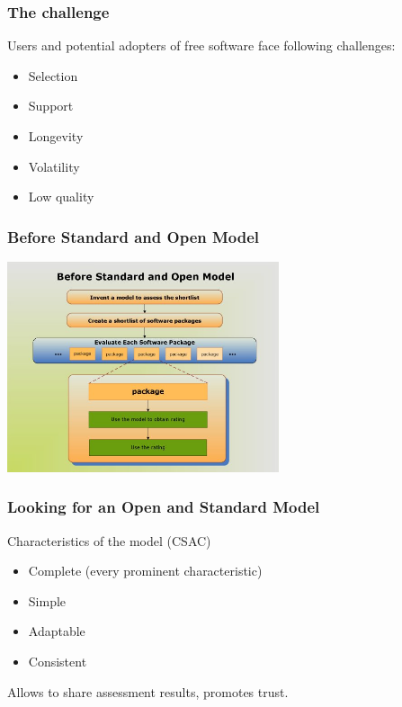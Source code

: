 \documentclass{beamer}
\begin{document}
\begin{frame}
\frametitle{The challenge}

Users and potential adopters of free software face following challenges:

\begin{itemize}
\item Selection
\item Support
\item Longevity
\item Volatility
\item Low quality
\end{itemize}

\end{frame}



\begin{frame}
\frametitle{Before Standard and Open Model}


\begin{center}
\includegraphics[width=8cm]{figs/Before_standard_and_open_model.jpg}
\end{center}

\end{frame}

\begin{frame}

\frametitle{Looking for an Open and Standard Model}

Characteristics of the model (CSAC)

\begin{itemize}
\item Complete (every prominent characteristic)
\item Simple
\item Adaptable
\item Consistent
\end{itemize}

Allows to share assessment results, promotes trust.

\end{frame}
\end{document}
